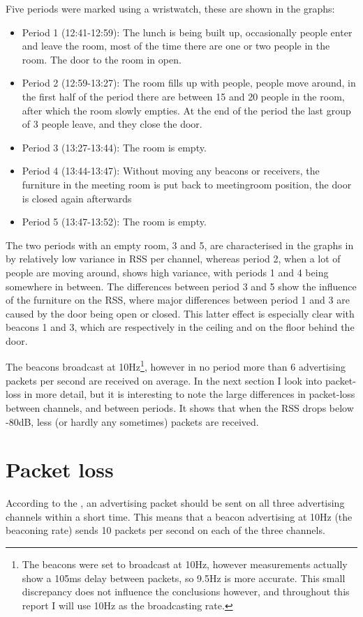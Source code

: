 Five periods were marked using a wristwatch, these are shown in the graphs:
\begin{itemize}
    \item Period 1 (12:41-12:59): The lunch is being built up, occasionally people enter and leave the room, most of the time there are one or two people in the room.
        The door to the room in open.
    \item Period 2 (12:59-13:27): The room fills up with people, people move around, in the first half of the period there are between 15 and 20 people in the room, after which the room slowly empties.
        At the end of the period the last group of 3 people leave, and they close the door.
    \item Period 3 (13:27-13:44): The room is empty.
    \item Period 4 (13:44-13:47): Without moving any beacons or receivers, the furniture in the meeting room is put back to meetingroom position, the door is closed again afterwards
    \item Period 5 (13:47-13:52): The room is empty.
\end{itemize}

The two periods with an empty room, 3 and 5, are characterised in the graphs in  by relatively low variance in RSS per channel, whereas period 2, when a lot of people are moving around, shows high variance, with periods 1 and 4 being somewhere in between.
The differences between period 3 and 5 show the influence of the furniture on the RSS, where major differences between period 1 and 3 are caused by the door being open or closed.
This latter effect is especially clear with beacons 1 and 3, which are respectively in the ceiling and on the floor behind the door.

The beacons broadcast at 10Hz\footnote{The beacons were set to broadcast at 10Hz, however measurements actually show a 105ms delay between packets, so 9.5Hz is more accurate. This small discrepancy does not influence the conclusions however, and throughout this report I will use 10Hz as the broadcasting rate.}, however in no period more than 6 advertising packets per second are received on average.
In the next section I look into packet-loss in more detail, but it is interesting to note the large differences in packet-loss between channels, and between periods.
It shows that when the RSS drops below -80dB, less (or hardly any sometimes) packets are received.

\section{Packet loss}
\label{sec:rss-packet-loss}
According to the \BTspec, an advertising packet should be sent on all three advertising channels within a short time.
This means that a beacon advertising at 10Hz (the beaconing rate) sends 10 packets per second on each of the three channels.

